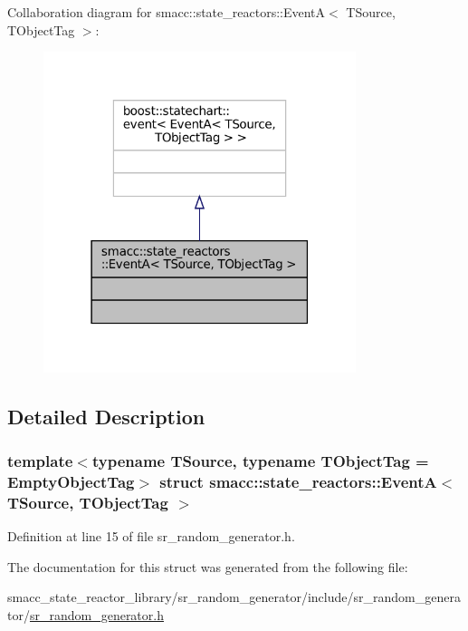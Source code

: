 Collaboration diagram for smacc\+:\+:state\+\_\+reactors\+:\+:EventA$<$ T\+Source, T\+Object\+Tag $>$\+:
\nopagebreak
\begin{figure}[H]
\begin{center}
\leavevmode
\includegraphics[width=259pt]{structsmacc_1_1state__reactors_1_1EventA__coll__graph}
\end{center}
\end{figure}


\subsection{Detailed Description}
\subsubsection*{template$<$typename T\+Source, typename T\+Object\+Tag = Empty\+Object\+Tag$>$\newline
struct smacc\+::state\+\_\+reactors\+::\+Event\+A$<$ T\+Source, T\+Object\+Tag $>$}



Definition at line 15 of file sr\+\_\+random\+\_\+generator.\+h.



The documentation for this struct was generated from the following file\+:\begin{DoxyCompactItemize}
\item 
smacc\+\_\+state\+\_\+reactor\+\_\+library/sr\+\_\+random\+\_\+generator/include/sr\+\_\+random\+\_\+generator/\hyperlink{sr__random__generator_8h}{sr\+\_\+random\+\_\+generator.\+h}\end{DoxyCompactItemize}

